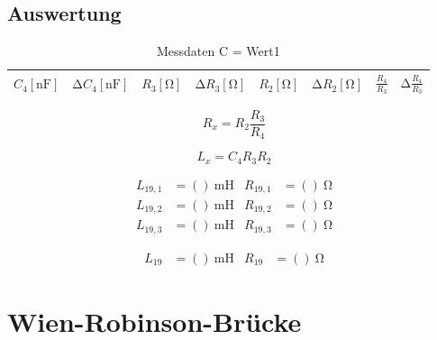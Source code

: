 \subsection{Auswertung}
\begin{table}
  \centering
  \caption{Messdaten C = Wert1}
  \label{tab:7}
  \begin{tabular}{c c c c c c c c}
    \toprule
    {$C_4 [\si{\nano\farad}]$} & {$\increment C_4 [\si{\nano\farad}]$} & {$R_3 [\si{\ohm}]$} & {$\increment R_3 [\si{\ohm}]$} & {$R_2 [\si{\ohm}]$} & {$\increment R_2 [\si{\ohm}]$} & {$\frac{R_4}{R_3}$} & {$\increment \frac{R_4}{R_3}$} \\
    \midrule
    
    \bottomrule
  \end{tabular}
\end{table}

\begin{equation}
  R_x = R_2 \frac{R_3}{R_4}
\end{equation}

\begin{equation}
  L_x = C_4R_3R_2
\end{equation}

\begin{align}
  L_{19,1}   &= ()\:\si{\milli\henry} & R_{19,1} &= ()\:\si{\ohm}\\
  L_{19,2}   &= ()\:\si{\milli\henry} & R_{19,2} &= ()\:\si{\ohm}\\
  L_{19,3}   &= ()\:\si{\milli\henry} & R_{19,3} &= ()\:\si{\ohm}
\end{align}

\begin{align}
  L_{19}   &= ()\:\si{\milli\henry} & R_{19} &= ()\:\si{\ohm}
\end{align}

\section{Wien-Robinson-Brücke}

